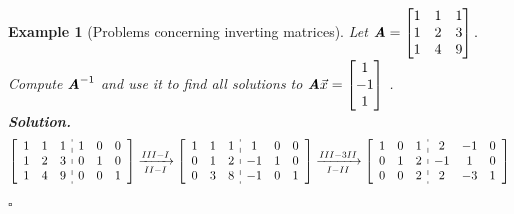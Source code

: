 \documentclass[12pt, a4paper]{article}
\newtheorem{eg}{Example}[subsection]
\newenvironment*{sol}{\indent\textbf{Solution. }}{\hfill{$\square$}\par}
\def\vecx{\vec{x}}
\def\matrixA{\textbf{\emph{A}}}
\begin{document}
\begin{eg}[Problems concerning inverting matrices]
	Let $\matrixA=\begin{bmatrix}1&1&1\\1&2&3\\1&4&9\end{bmatrix}.$ Compute $\matrixA^{-1}$ and use it to find all solutions to $\matrixA\vecx=\begin{bmatrix}1\\-1\\1\end{bmatrix}$	.\\
	\begin{sol}
		$$\begin{aligned}
			\left[\begin{array}{c:c}\begin{matrix}1&1&1\\1&2&3\\1&4&9\end{matrix}&\begin{matrix}1&0&0\\0&1&0\\0&0&1\end{matrix}\end{array}\right]&\xrightarrow[II-I]{III-I}\left[\begin{array}{c:c}\begin{matrix}1&1&1\\0&1&2\\0&3&8\end{matrix}&\begin{matrix}1&0&0\\-1&1&0\\-1&0&1\end{matrix}\end{array}\right]\xrightarrow[I-II]{III-3II}\left[\begin{array}{c:c}\begin{matrix}1&0&1\\0&1&2\\0&0&2\end{matrix}&\begin{matrix}2&-1&0\\-1&1&0\\2&-3&1\end{matrix}\end{array}\right]\\

\end{aligned}$$
\end{sol}
\end{eg}
\end{document}
